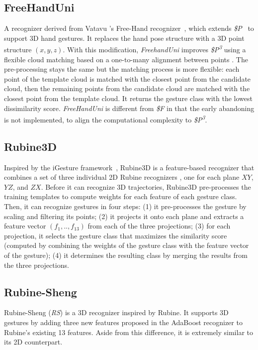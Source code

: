 \subsection{FreeHandUni}
A recognizer derived from Vatavu \etal's Free-Hand recognizer~\cite{Vatavu:2016}, which extends \textit{\$P}~\cite{Vatavu:2012} to support 3D hand gestures. It replaces the hand pose structure with a 3D point structure $(x,y,z)$. With this modification, \textit{FreehandUni} improves \textit{\$P\textsuperscript{3}} using a flexible cloud matching based on a one-to-many alignment between points \cite{Vatavu:2017a}. The pre-processing stays the same but the matching process is more flexible: each point of the template cloud is matched with the closest point from the candidate cloud, then the remaining points from the candidate cloud are matched with the closest point from the template cloud. It returns the gesture class with the lowest dissimilarity score. \textit{FreeHandUni} is different from \textit{\$F} in that the early abandoning is not implemented, to align the computational complexity to \textit{\$P\textsuperscript{3}}.
    
\subsection{Rubine3D}
Inspired by the iGesture framework~\cite{Signer:2007}, Rubine3D is a feature-based recognizer that combines a set of three individual 2D Rubine recognizers \cite{Rubine:1991}, one for each plane $XY$, $YZ$, and $ZX$. Before it can recognize 3D trajectories, Rubine3D pre-processes the training templates to compute weights for each feature of each gesture class. Then, it can recognize gestures in four steps: (1) it pre-processes the gesture by scaling and filtering its points; (2) it projects it onto each plane and extracts a feature vector $(f_1,..,f_{13})$ from each of the three projections; (3) for each projection, it selects the gesture class that maximizes the similarity score (computed by combining the weights of the gesture class with the feature vector of the gesture); (4) it determines the resulting class by merging the results from the three projections.

\subsection{Rubine-Sheng}
Rubine-Sheng (\textit{RS}) is a 3D recognizer inspired by Rubine. It supports 3D gestures by adding three new features proposed in the AdaBoost recognizer \cite{Sheng:2004} to Rubine's existing 13 features. Aside from this difference, it is extremely similar to its 2D counterpart.
    

